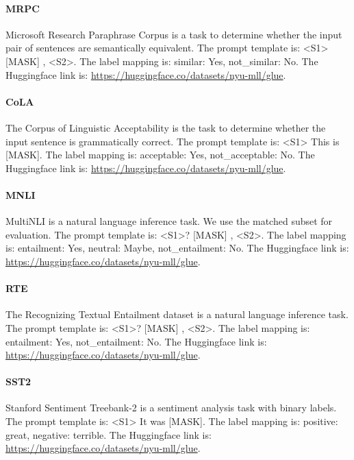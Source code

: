 \paragraph{MRPC} Microsoft Research Paraphrase Corpus \citep{dolan2005automatically} is a task to determine whether the input pair of sentences are semantically equivalent. The prompt template is: \textless{}S1\textgreater{} {[}MASK{]} , \textless{}S2\textgreater{}. The label mapping is: similar: Yes, not\_similar: No. The Huggingface link is: \url{https://huggingface.co/datasets/nyu-mll/glue}.

\paragraph{CoLA} The Corpus of Linguistic Acceptability \citep{warstadt2019neural} is the task to determine whether the input sentence is grammatically correct. The prompt template is: \textless{}S1\textgreater{} This is {[}MASK{]}. The label mapping is: acceptable: Yes, not\_acceptable: No. The Huggingface link is: \url{https://huggingface.co/datasets/nyu-mll/glue}.

\paragraph{MNLI} MultiNLI \citep{williams2017broad} is a natural language inference task. We use the matched subset for evaluation. The prompt template is: \textless{}S1\textgreater{}? {[}MASK{]} , \textless{}S2\textgreater{}. The label mapping is: entailment: Yes, neutral: Maybe, not\_entailment: No. The Huggingface link is: \url{https://huggingface.co/datasets/nyu-mll/glue}.

\paragraph{RTE} The Recognizing Textual Entailment \citep{wang2018glue} dataset is a natural language inference task. The prompt template is: \textless{}S1\textgreater{}? {[}MASK{]} , \textless{}S2\textgreater{}. The label mapping is: entailment: Yes, not\_entailment: No. The Huggingface link is: \url{https://huggingface.co/datasets/nyu-mll/glue}.

\paragraph{SST2} Stanford Sentiment Treebank-2 \citep{socher2013recursive} is a sentiment analysis task with binary labels. The prompt template is: \textless{}S1\textgreater{} It was {[}MASK{]}. The label mapping is: positive: great, negative: terrible. The Huggingface link is: \url{https://huggingface.co/datasets/nyu-mll/glue}.

